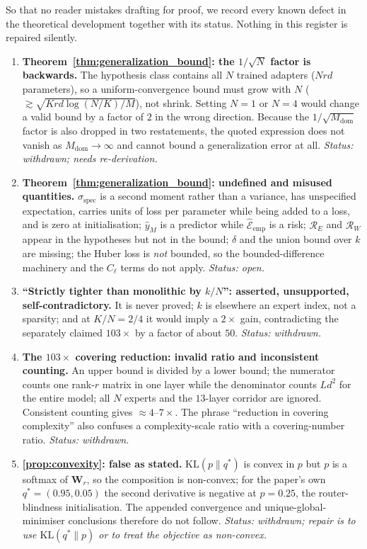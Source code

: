 \documentclass{article}
\theoremstyle{definition}
\begin{document}
So that no reader mistakes drafting for proof, we record every known defect in the theoretical development together with its status. Nothing in this register is repaired silently.

\begin{enumerate}[leftmargin=1.5em,itemsep=2pt]
    \item \textbf{Theorem~\ref{thm:generalization_bound}: the $1/\sqrt{N}$ factor is backwards.} The hypothesis class contains all $N$ trained adapters ($Nrd$ parameters), so a uniform-convergence bound must grow with $N$ ($\gtrsim \sqrt{Krd\log(N/K)/M}$), not shrink. Setting $N=1$ or $N=4$ would change a valid bound by a factor of $2$ in the wrong direction. Because the $1/\sqrt{M_{\text{dom}}}$ factor is also dropped in two restatements, the quoted expression does not vanish as $M_{\text{dom}} \to \infty$ and cannot bound a generalization error at all. \emph{Status: withdrawn; needs re-derivation.}
    \item \textbf{Theorem~\ref{thm:generalization_bound}: undefined and misused quantities.} $\sigma_{\text{spec}}$ is a second moment rather than a variance, has unspecified expectation, carries units of loss per parameter while being added to a loss, and is zero at initialisation; $\hat{y}_M$ is a predictor while $\hat{\mathcal E}_{\text{emp}}$ is a risk; $\mathcal{R}_E$ and $\mathcal{R}_W$ appear in the hypotheses but not in the bound; $\delta$ and the union bound over $k$ are missing; the Huber loss is \emph{not} bounded, so the bounded-difference machinery and the $C_{\ell}$ terms do not apply. \emph{Status: open.}
    \item \textbf{``Strictly tighter than monolithic by $k/N$'': asserted, unsupported, self-contradictory.} It is never proved; $k$ is elsewhere an expert index, not a sparsity; and at $K/N = 2/4$ it would imply a $2\times$ gain, contradicting the separately claimed $103\times$ by a factor of about $50$. \emph{Status: withdrawn.}
    \item \textbf{The $103\times$ covering reduction: invalid ratio and inconsistent counting.} An upper bound is divided by a lower bound; the numerator counts one rank-$r$ matrix in one layer while the denominator counts $L d^{2}$ for the entire model; all $N$ experts and the $13$-layer corridor are ignored. Consistent counting gives $\approx 4$--$7\times$. The phrase ``reduction in covering complexity'' also confuses a complexity-scale ratio with a covering-number ratio. \emph{Status: withdrawn.}
    \item \textbf{\cref{prop:convexity}: false as stated.} $\mathrm{KL}(p\|q^{*})$ is convex in $p$ but $p$ is a softmax of $\mathbf{W}_r$, so the composition is non-convex; for the paper's own $q^{*}=(0.95,0.05)$ the second derivative is negative at $p=0.25$, the router-blindness initialisation. The appended convergence and unique-global-minimiser conclusions therefore do not follow. \emph{Status: withdrawn; repair is to use $\mathrm{KL}(q^{*}\|p)$ or to treat the objective as non-convex.}

\end{enumerate}
\end{document}
